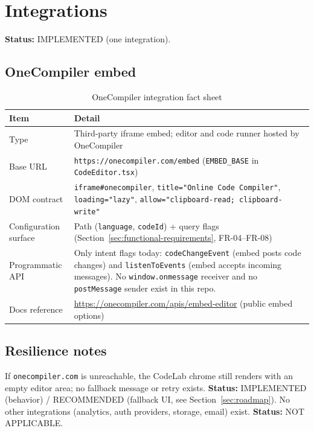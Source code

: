 \section{Integrations}
\label{sec:integrations}

\textbf{Status:} IMPLEMENTED (one integration).

\subsection{OneCompiler embed}
\begin{table}[H]
\centering
\caption{OneCompiler integration fact sheet}
\begin{tabular}{|l|p{8.5cm}|}
\hline
\textbf{Item} & \textbf{Detail} \\ \hline
Type & Third-party iframe embed; editor and code runner hosted by OneCompiler \\ \hline
Base URL & \texttt{https://onecompiler.com/embed} (\texttt{EMBED\_BASE} in \texttt{CodeEditor.tsx}) \\ \hline
DOM contract & \texttt{iframe\#onecompiler}, \texttt{title="Online Code Compiler"}, \texttt{loading="lazy"}, \texttt{allow="clipboard-read; clipboard-write"} \\ \hline
Configuration surface & Path (\texttt{language}, \texttt{codeId}) + query flags (Section~\ref{sec:functional-requirements}, FR-04--FR-08) \\ \hline
Programmatic API & Only intent flags today: \texttt{codeChangeEvent} (embed posts code changes) and \texttt{listenToEvents} (embed accepts incoming messages). No \texttt{window.onmessage} receiver and no \texttt{postMessage} sender exist in this repo. \\ \hline
Docs reference & \url{https://onecompiler.com/apis/embed-editor} (public embed options) \\ \hline
\end{tabular}
\end{table}

\subsection{Resilience notes}
If \texttt{onecompiler.com} is unreachable, the CodeLab chrome still renders with an empty editor area; no fallback message or retry exists. \textbf{Status:} IMPLEMENTED (behavior) / RECOMMENDED (fallback UI, see Section~\ref{sec:roadmap}). No other integrations (analytics, auth providers, storage, email) exist. \textbf{Status:} NOT APPLICABLE.
